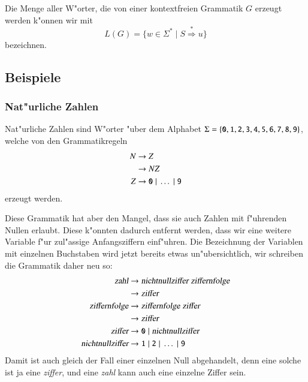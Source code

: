 \begin{definition}
Die Menge aller W"orter, die von einer kontextfreien Grammatik 
$G$ erzeugt werden k"onnen wir mit
\[
L(G)=\{w\in\Sigma^*\;|\; S\overset{*}{\Rightarrow} u\}
\]
bezeichnen.
\end{definition}

\subsection{Beispiele}
\subsubsection{Nat"urliche Zahlen}
Nat"urliche Zahlen sind W"orter "uber dem Alphabet $\Sigma=\{
{\tt 0},
{\tt 1},
{\tt 2},
{\tt 3},
{\tt 4},
{\tt 5},
{\tt 6},
{\tt 7},
{\tt 8},
{\tt 9}\}$, welche von den Grammatikregeln
\begin{align*}
N&\to Z\\
 &\to NZ\\
Z&\to {\tt 0}\;|\;\dots \;|\;{\tt 9}
\end{align*}
erzeugt werden.

Diese Grammatik hat aber den Mangel, dass sie auch Zahlen
mit f"uhrenden Nullen erlaubt.
Diese k"onnten dadurch entfernt
werden, dass wir eine weitere Variable f"ur zul"assige
Anfangsziffern einf"uhren.
Die Bezeichnung der Variablen mit einzelnen Buchstaben wird jetzt
bereits etwas un"ubersichtlich, wir schreiben die Grammatik daher neu
so:
\begin{align*}
\textsl{zahl}           &\to\textsl{nichtnullziffer}\; \textsl{ziffernfolge} \\
                        &\to\textsl{ziffer}\\
\textsl{ziffernfolge}   &\to \textsl{ziffernfolge}\; \textsl{ziffer}\\
                        &\to \textsl{ziffer}\\
\textsl{ziffer}         &\to \texttt{0}\; |\; \textsl{nichtnullziffer}\\
\textsl{nichtnullziffer}&\to \texttt{1}\;|\;\texttt{2}\;|\;\dots\;|\;\texttt{9}
\end{align*}
Damit ist auch gleich der Fall einer einzelnen Null abgehandelt, denn eine
solche ist ja eine \textsl{ziffer}, und eine \textsl{zahl} kann auch eine
einzelne Ziffer sein.

